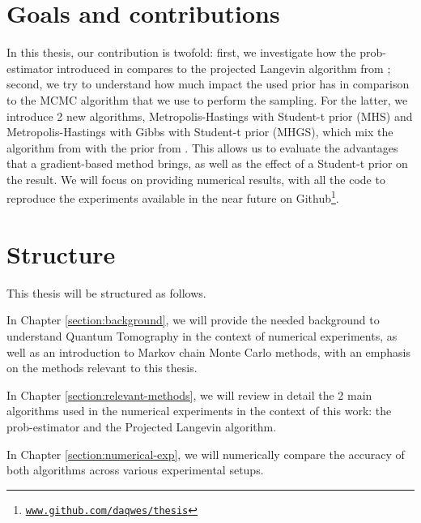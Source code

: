 \documentclass[12pt]{memoir}
\begin{document}



\section{Goals and contributions}\label{section:goals-contributions}

In this thesis, our contribution is twofold: first, we investigate how the prob-estimator introduced in \cite{MA17} compares to the projected Langevin algorithm from \cite{meth:bayesian:Langevin:ACMT2024}; second, we try to understand how much impact the used prior has in comparison to the MCMC algorithm that we use to perform the sampling. For the latter, we introduce 2 new algorithms, Metropolis-Hastings with Student-t prior (MHS) and Metropolis-Hastings with Gibbs with Student-t prior (MHGS), which mix the algorithm from \cite{MA17} with the prior from \cite{meth:bayesian:Langevin:ACMT2024}. This allows us to evaluate the advantages that a gradient-based method brings, as well as the effect of a Student-t prior on the result. We will focus on providing numerical results, with all the code to reproduce the experiments available in the near future on Github\footnote{\texttt{\url{www.github.com/daqwes/thesis}}}.


\section{Structure}

This thesis will be structured as follows.\medbreak


In Chapter \ref{section:background}, we will provide the needed background to understand Quantum Tomography in the context of numerical experiments, as well as an introduction to Markov chain Monte Carlo methods, with an emphasis on the methods relevant to this thesis.\medbreak


In Chapter \ref{section:relevant-methods}, we will review in detail the 2 main algorithms used in the numerical experiments in the context of this work: the prob-estimator and the Projected Langevin algorithm.\medbreak


In Chapter \ref{section:numerical-exp}, we will numerically compare the accuracy of both algorithms across various experimental setups.\medbreak
\end{document}
